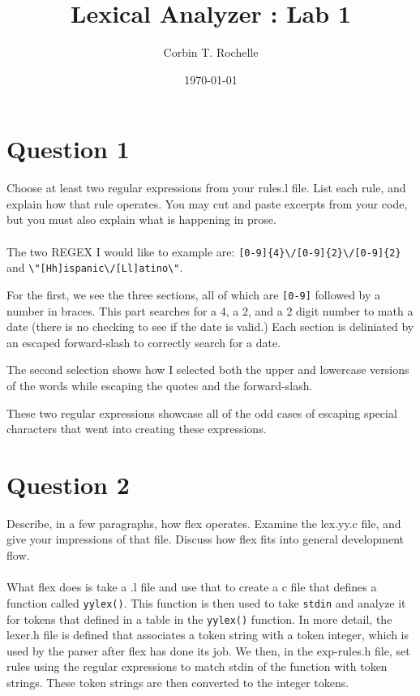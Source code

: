 \documentclass{article}
\title{Lexical Analyzer : Lab 1}
\author{Corbin T. Rochelle}
\date{\today}
\begin{document}
\maketitle

\section{Question 1}
Choose at least two regular expressions from your rules.l file. 
List each rule, and explain how that rule operates. 
You may cut and paste excerpts from your code, but you must also explain what is happening in prose.
\\~\\
The two REGEX I would like to example are: \verb|[0-9]{4}\/[0-9]{2}\/[0-9]{2}| and \verb|\"[Hh]ispanic\/[Ll]atino\"|.

For the first, we see the three sections, all of which are \verb|[0-9]| followed by a number in braces. 
This part searches for a 4, a 2, and a 2 digit number to math a date (there is no checking to see if the date is valid.) 
Each section is deliniated by an escaped forward-slash to correctly search for a date. 

The second selection shows how I selected both the upper and lowercase versions of the words while escaping the quotes and the forward-slash.

These two regular expressions showcase all of the odd cases of escaping special characters that went into creating these expressions. 

\section{Question 2}
Describe, in a few paragraphs, how flex operates. Examine the lex.yy.c file, and give your impressions of that file. Discuss how flex fits into general development flow.
\\~\\
What flex does is take a .l file and use that to create a c file that defines a function called \verb|yylex()|. 
This function is then used to take \verb|stdin| and analyze it for tokens that defined in a table in the \verb|yylex()| function. 
In more detail, the lexer.h file is defined that associates a token string with a token integer, which is used by the parser after flex has done its job.
We then, in the exp-rules.h file,  set rules using the regular expressions to match stdin of the function with token strings.
These token strings are then converted to the integer tokens. 
\end{document}
